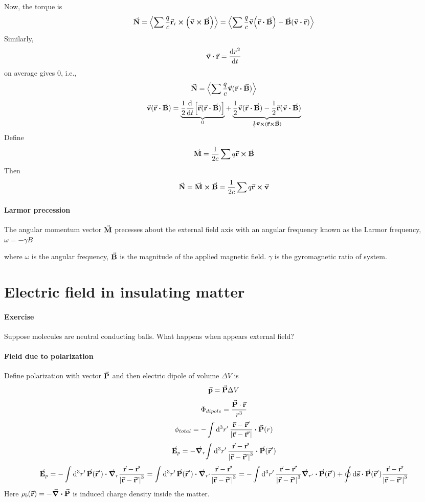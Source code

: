 Now, the torque is
$$\va{N} = \expval{\sum \frac{q}{c} \va{r}_i \cross \qty(\va{v} \cross \va{B})} = \expval{\sum \frac{q}{c} \va{v} \qty(\va{r}\vdot \va{B}) - \va{B} \qty(\va{v} \vdot \va{r})}$$
Similarly, 
$$\va{v}\vdot \va{r} = \dv{r^2}{t}$$
on average gives $0$, i.e.,
$$\va{N} = \expval{\sum \frac{q}{c} \va{v}(\va{r} \vdot \va{B})}$$
$$\va{v}(\va{r} \vdot \va{B}) = \underbrace{\frac{1}{2} \dv{t}\qty[\va{r}(\va{r} \vdot \va{B})]}_{0} + \underbrace{\frac{1}{2} \va{v}(\va{r} \vdot \va{B}) - \frac{1}{2} \va{r}(\va{v} \vdot \va{B})}_{\frac{1}{2} \va{v}\cross (\va{r} \cross \va{B})}$$
Define
$$\va{M} = \frac{1}{2c} \sum q\va{r} \cross \va{B}$$
Then
$$\va{N}  = \va{M} \cross \va{B} = \frac{1}{2c}\sum q\va{r} \cross \va{v}$$
\paragraph{Larmor precession}
The angular momentum vector $\va{M}$ precesses about the external field axis with an angular frequency known as the Larmor frequency,
$ \omega =-\gamma B$

where $\omega $ is the angular frequency, $\va{B}$ is the magnitude of the applied magnetic field. $\gamma$ is the gyromagnetic ratio of system.

\section{Electric field in insulating matter}
\paragraph{Exercise}
Suppose molecules are neutral conducting balls. What happens when appears external field? 
\paragraph{Field due to polarization}
Define polarization with vector $\va{P}$ and then electric dipole of volume $\Delta V$ is
$$\va{p} = \va{P} \Delta V $$ %
$$\Phi_{dipole} = \frac{\va{P}\cdot \va{r}}{r^3}$$
$$\phi_{total} =- \int \dd[3]{r'} \frac{\va{r} - \va{r}'}{\abs{\va{r} -\va{r}'}}\vdot \va{P}(r) $$
$$ \va{E}_p = -\grad_r{\int \dd[3]{r'} \frac{\va{r}-\va{r}'}{\abs{\va{r}-\va{r}'}^3} \vdot \va{P}(\va{r}')}$$
$$\va{E}_p = -\int \dd[3]{r'}  \va{P}(\va{r}') \vdot \grad_r\frac{\va{r}-\va{r}'}{\abs{\va{r}-\va{r}'}^3}  = \int \dd[3]{r'}  \va{P}(\va{r}') \vdot \grad_{r'}\frac{\va{r}-\va{r}'}{\abs{\va{r}-\va{r}'}^3} = -\int \dd[3]{r'}  \frac{\va{r}-\va{r}'}{\abs{\va{r}-\va{r}'}^3}  \grad_{r'} \vdot \va{P}(\va{r}') + \oint \dd{\va{s}}  \vdot \va{P} (\va{r}') \frac{\va{r}-\va{r}'}{\abs{\va{r}-\va{r}'}^3}  $$
Here $\rho_b(\va{r}) = -\div{\va{P}}$ is induced charge density inside the matter.